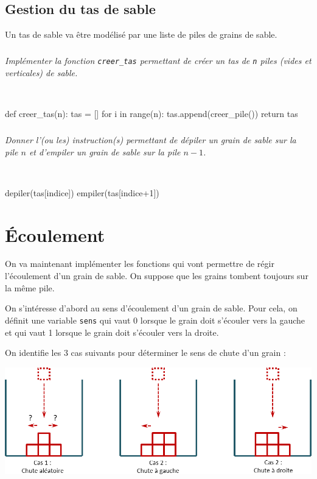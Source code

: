 \documentclass[10pt,fleqn]{article} %
\begin{document}
\subsection{Gestion du tas de sable}
Un tas de sable va être modélisé par une liste de piles de grains de sable. 

\subparagraph{}\textit{Implémenter la fonction \texttt{creer\_tas} permettant de créer un tas de \texttt{n} piles (vides et verticales) de sable.}
\ifprof
\begin{corrige}~\\
\begin{python}
def creer_tas(n):
    tas = []
    for i in range(n):
        tas.append(creer_pile())
    return tas
\end{python}
\end{corrige}
\else
\fi

\subparagraph{}\textit{Donner l'(ou les) instruction(s) permettant de dépiler un grain de sable sur la pile $n$ et d'empiler un grain de sable sur la pile $n-1$.}
\ifprof
\begin{corrige}~\\
\begin{python}
depiler(tas[indice])
empiler(tas[indice+1])
\end{python}
\end{corrige}
\else
\fi

\section{Écoulement}
On va maintenant implémenter les fonctions qui vont permettre de régir l'écoulement d'un grain de sable. On suppose que les grains tombent toujours sur la même pile. 

On s'intéresse d'abord au sens d'écoulement d'un grain de sable. Pour cela, on définit une variable \texttt{sens} qui vaut 0 lorsque le grain doit s'écouler vers la gauche et qui vaut 1 lorsque le grain doit s'écouler vers la droite. 

On identifie les 3 cas suivants pour déterminer le sens de chute d'un grain :
\begin{center}
\includegraphics[width=\linewidth]{images/sablier_03}
\end{center}
\end{document}

